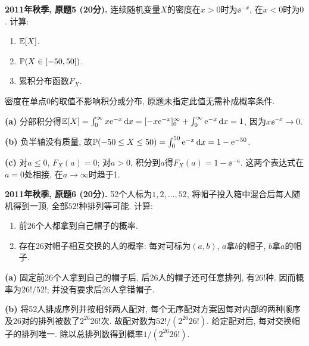 \begin{exercise}\label{ex:m1-2011f-q5}
\textbf{2011年秋季, 原题5 (20分).} 连续随机变量$X$的密度在$x>0$时为$\ee^{-x}$, 在$x<0$时为$0$. 计算:
\begin{enumerate}\item[(a)]\label{ex:m1-2011f-q5-a} $\mathbb E[X]$.\item[(b)]\label{ex:m1-2011f-q5-b} $\mathbb P(X\in[-50,50])$.\item[(c)]\label{ex:m1-2011f-q5-c} 累积分布函数$F_X$.\end{enumerate}
\end{exercise}
\begin{solution}
密度在单点$0$的取值不影响积分或分布, 原题未指定此值无需补成概率条件.

\textbf{(a)}\label{sol:m1-2011f-q5-a} 分部积分得$\mathbb E[X]=\int_0^\infty x\mathrm e^{-x}\,\mathrm d x=[-x\mathrm e^{-x}]_0^\infty+\int_0^\infty\mathrm e^{-x}\,\mathrm d x=1$, 因为$x\ee^{-x}\to0$.

\textbf{(b)}\label{sol:m1-2011f-q5-b} 负半轴没有质量, 故$\mathbb P(-50\le X\le50)=\int_0^{50}\mathrm e^{-x}\,\mathrm d x=1-\mathrm e^{-50}$.

\textbf{(c)}\label{sol:m1-2011f-q5-c} 对$a\le0$, $F_X(a)=0$; 对$a>0$, 积分到$a$得$F_X(a)=1-\ee^{-a}$. 这两个表达式在$a=0$处相接, 在$a\to\infty$时趋于1.
\end{solution}

\begin{exercise}\label{ex:m1-2011f-q6}
\textbf{2011年秋季, 原题6 (20分).} 52个人标为$1,2,\ldots,52$, 将帽子投入箱中混合后每人随机得到一顶, 全部$52!$种排列等可能. 计算:
\begin{enumerate}\item[(a)]\label{ex:m1-2011f-q6-a} 前26个人都拿到自己帽子的概率.\item[(b)]\label{ex:m1-2011f-q6-b} 存在26对帽子相互交换的人的概率: 每对可标为$(a,b)$, $a$拿$b$的帽子, $b$拿$a$的帽子.\end{enumerate}
\end{exercise}
\begin{solution}
\textbf{(a)}\label{sol:m1-2011f-q6-a} 固定前26个人拿到自己的帽子后, 后26人的帽子还可任意排列, 有$26!$种. 因而概率为$26!/52!$; 并没有要求后26人拿错帽子.

\textbf{(b)}\label{sol:m1-2011f-q6-b} 将52人排成序列并按相邻两人配对, 每个无序配对方案因每对内部的两种顺序及26对的排列被数了$2^{26}26!$次. 故配对数为$52!/(2^{26}26!)$. 给定配对后, 每对交换帽子的排列唯一. 除以总排列数得到概率$1/(2^{26}26!)$.
\end{solution}

